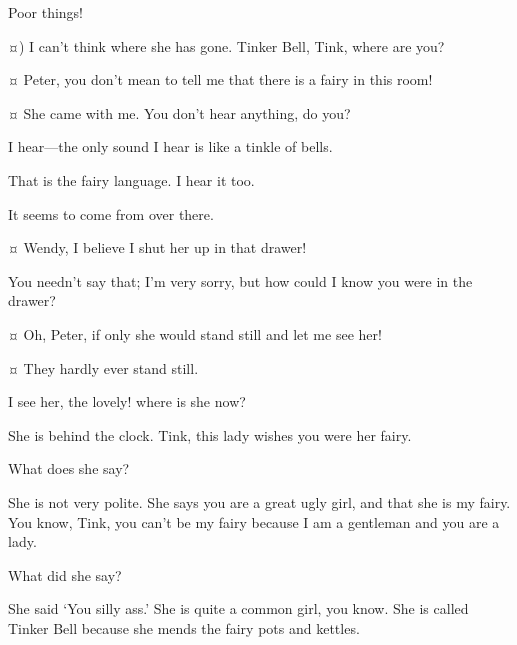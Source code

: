 \begin{drama}
\wendyspeaks
Poor things!

\peterspeaks {}¤)
I can’t think where she has gone.
Tinker Bell, Tink, where are you?

\wendyspeaks {}¤
Peter, you don’t mean to tell me that there is a fairy in this room!

\peterspeaks {}¤
She came with me.
You don’t hear anything, do you?

\wendyspeaks
I hear—the only sound I hear is like a tinkle of bells.

\peterspeaks
That is the fairy language.
I hear it too.

\wendyspeaks
It seems to come from over there.

\peterspeaks
{}¤
Wendy, I believe I shut her up in that drawer!


\speakercontinues
You needn’t say that; I’m very sorry, but how could I know you were in the drawer?

\wendyspeaks {}¤
Oh, Peter, if only she would stand still and let me see her!

\peterspeaks {}¤
They hardly ever stand still.


\wendyspeaks
I see her, the lovely!
where is she now?

\peterspeaks
She is behind the clock.
Tink, this lady wishes you were her fairy.

\wendyspeaks
What does she say?

\peterspeaks
She is not very polite.
She says you are a great ugly girl, and that she is my fairy.
You know, Tink, you can’t be my fairy because I am a gentleman and you are a lady.


\wendyspeaks
What did she say?

\peterspeaks
She said ‘You silly ass.’
She is quite a common girl, you know.
She is called Tinker Bell because she mends the fairy pots and kettles.



\end{drama}
